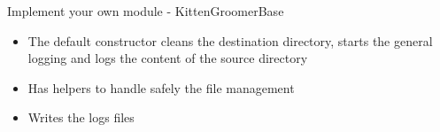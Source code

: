 \begin{frame}[fragile]{Implement your own module - KittenGroomerBase}
    \begin{itemize}
        \item The default constructor cleans the destination directory, starts the general logging and logs the content of the source directory
        \item Has helpers to handle safely the file management
        \item Writes the logs files
   \end{itemize}
\end{frame}

